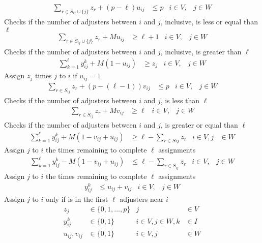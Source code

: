 \begin{align}
  \sum_{r \in S_{ij}\cup\{j\}}{
    z_{r}
  }
  + (p-\ell) u_{ij}
  & \leq p
  & i \in V,
  & j \in W
\end{align}
Checks if
the number of adjusters between $i$ and $j$,
inclusive,
is less or equal than $\ell$
\begin{align}
  \sum_{r \in S_{ij}\cup\{j\}}{
    z_{r}
  }
  + M u_{ij}
  & \geq \ell+1
  & i \in V,
  & j \in W
\end{align}
Checks if
the number of adjusters between $i$ and $j$,
inclusive,
is greater than $\ell$
\begin{align}
  \sum_{k = 1}^{\ell}{
    y_{ij}^{k}
  }
  + M (1 - u_{ij})
  & \geq z_j
  & i \in V,
  & j \in W
\end{align}
Assign $z_j$ times $j$ to $i$ if $u_{ij} = 1$
\begin{align}
  \sum_{r \in S_{ij}}{
    z_{r}
  }
  + (p-(\ell-1)) v_{ij}
  & \leq p
  & i \in V,
  & j \in W
\end{align}
Checks if
the number of adjusters between $i$ and $j$,
is less than $\ell$
\begin{align}
  \sum_{r \in S_{ij}}{
    z_{r}
  }
  + M v_{ij}
  & \geq \ell
  & i \in V,
  & j \in W
\end{align}
Checks if
the number of adjusters between $i$ and $j$,
is greater or equal than $\ell$
\begin{align}
  \sum_{k=1}^{\ell}{
    y_{ij}^{k}
  }
  + M (1 - v_{ij} + u_{ij})
  & \geq \ell
  - \sum_{r \in S{ij}}{
    z_{r}
  } 
  &  i \in V, j 
  & \in W
\end{align}
Assign $j$ to $i$
the times remaining to complete $\ell$ assignments
\begin{align}
  \sum_{k=1}^{\ell}{
    y_{ij}^{k}
  }
  - M (1 - v_{ij} + u_{ij})
  & \leq \ell 
  - \sum_{r \in S_{ij}}{
    z_{r}
  }
  & i \in V,
  & j \in W
\end{align}
Assign $j$ to $i$
the times remaining to complete $\ell$ assignments
\begin{align}
  y_{ij}^{k}
  & \leq u_{ij}
  + v_{ij}
  & i \in V,
  & j \in W
\end{align}
Assign $j$ to $i$
only if
is in the first $\ell$ adjusters near $i$
\begin{align}
  z_j
  & \in \{0,1,\ldots,p\}
  & j
  & \in V \nonumber
  \\
  y_{ij}^{k} 
  & \in \{0,1\}
  & i\in V,j\in W,k
  & \in I \nonumber
  \\
  u_{ij},v_{ij}
  & \in \{0,1\}
  & i \in V,j
  & \in W \nonumber
\end{align}
